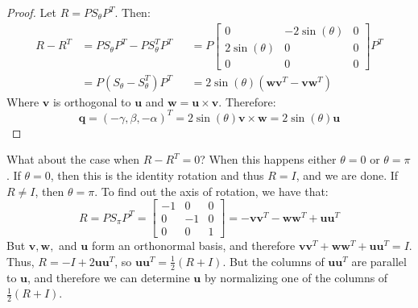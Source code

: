 \documentclass[../main.tex]{subfiles}
\begin{document}
\begin{proof}
Let $R = PS_{\theta}P^T$. Then:
\begin{align*}
    R-R^{T} &= PS_{\theta}P^{T} - PS_{\theta}^{T}P^{T} & &= P\begin{bmatrix}0 & -2\sin(\theta) & 0 \\ 2\sin(\theta) & 0 & 0 \\ 0 & 0 & 0 \end{bmatrix}P^{T}\\
    &= P(S_{\theta}-S_{\theta}^{T})P^{T} & &= 2\sin(\theta)(\mathbf{w}\mathbf{v}^{T} - \mathbf{v}\mathbf{w}^{T})
\end{align*} 
Where $\mathbf{v}$ is orthogonal to $\mathbf{u}$ and $\mathbf{w} = \mathbf{u}\times \mathbf{v}$. Therefore:
\begin{equation*}
    \mathbf{q} = (-\gamma, \beta, -\alpha)^{T} = 2\sin(\theta) \mathbf{v}\times \mathbf{w} = 2\sin(\theta) \mathbf{u}
\end{equation*}
\end{proof}
%
\begin{remark}
What about the case when $R-R^T = 0$? When this happens either $\theta = 0$ or $\theta = \pi$. If $\theta = 0$, then this is the identity rotation and thus $R = I$, and we are done. If $R\ne I$, then $\theta = \pi$. To find out the axis of rotation, we have that:
%
\begin{equation*}
    R = PS_{\pi}P^T = \begin{bmatrix}-1 & 0 & 0 \\ 0 & -1 & 0 \\ 0 & 0 & 1 \end{bmatrix} = -\mathbf{v}\mathbf{v}^T - \mathbf{w}\mathbf{w}^T +\mathbf{u}\mathbf{u}^T    
\end{equation*}
%
But $\mathbf{v},\mathbf{w},$ and $\mathbf{u}$ form an orthonormal basis, and therefore $\mathbf{v}\mathbf{v}^T + \mathbf{w}\mathbf{w}^T+\mathbf{u}\mathbf{u}^T = I$. Thus, $R = -I+2\mathbf{u}\mathbf{u}^T$, so $\mathbf{u} \mathbf{u}^T = \frac{1}{2}(R+I)$. But the columns of $\mathbf{u}\mathbf{u}^T$ are parallel to $\mathbf{u}$, and therefore we can determine $\mathbf{u}$ by normalizing one of the columns of $\frac{1}{2}(R+I)$.
\end{remark}
%
\end{document}
